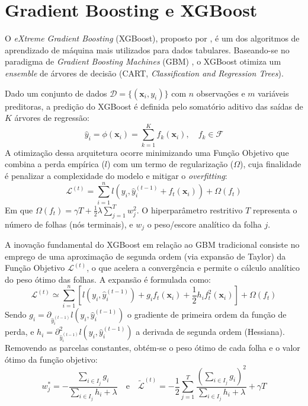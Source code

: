 \section{Gradient Boosting e XGBoost}
O \textit{eXtreme Gradient Boosting} (XGBoost), proposto por \cite{chen2016xgboost}, é um dos algoritmos de aprendizado de máquina mais utilizados para dados tabulares. Baseando-se no paradigma de \textit{Gradient Boosting Machines} (GBM) \cite{friedman2001greedy}, o XGBoost otimiza um \textit{ensemble} de árvores de decisão (CART, \textit{Classification and Regression Trees}).

Dado um conjunto de dados $\mathcal{D} = \{(\textbf{x}_i, y_i)\}$ com $n$ observações e $m$ variáveis preditoras, a predição do XGBoost é definida pelo somatório aditivo das saídas de $K$ árvores de regressão:
\begin{equation}
    \hat{y}_i = \phi(\textbf{x}_i) = \sum_{k=1}^K f_k(\textbf{x}_i), \quad f_k \in \mathcal{F}
    \label{eq:xgboost_pred}
\end{equation}
A otimização dessa arquitetura ocorre minimizando uma Função Objetivo que combina a perda empírica ($l$) com um termo de regularização ($\Omega$), cuja finalidade é penalizar a complexidade do modelo e mitigar o \textit{overfitting}:
\begin{equation}
    \mathcal{L}^{(t)} = \sum_{i=1}^n l(y_i, \hat{y}_i^{(t-1)} + f_t(\textbf{x}_i)) + \Omega(f_t)
    \label{eq:xgboost_loss}
\end{equation}
Em que $\Omega(f_t) = \gamma T + \frac{1}{2} \lambda \sum_{j=1}^T w_j^2$. O hiperparâmetro restritivo $T$ representa o número de folhas (nós terminais), e $w_j$ o peso/escore analítico da folha $j$. 

A inovação fundamental do XGBoost em relação ao GBM tradicional consiste no emprego de uma aproximação de segunda ordem (via expansão de Taylor) da Função Objetivo $\mathcal{L}^{(t)}$, o que acelera a convergência e permite o cálculo analítico do peso ótimo das folhas. A expansão é formulada como:
\begin{equation}
    \mathcal{L}^{(t)} \simeq \sum_{i=1}^n \left[ l(y_i, \hat{y}_i^{(t-1)}) + g_i f_t(\textbf{x}_i) + \frac{1}{2} h_i f_t^2(\textbf{x}_i) \right] + \Omega(f_t)
\end{equation}
Sendo $g_i = \partial_{\hat{y}_i^{(t-1)}} l(y_i, \hat{y}_i^{(t-1)})$ o gradiente de primeira ordem da função de perda, e $h_i = \partial_{\hat{y}_i^{(t-1)}}^2 l(y_i, \hat{y}_i^{(t-1)})$ a derivada de segunda ordem (Hessiana). Removendo as parcelas constantes, obtém-se o peso ótimo de cada folha e o valor ótimo da função objetivo:
\begin{equation}
    w_j^\ast = - \frac{\sum_{i \in I_j} g_i}{\sum_{i \in I_j} h_i + \lambda} \quad \text{e} \quad \tilde{\mathcal{L}}^{(t)} = -\frac{1}{2} \sum_{j=1}^T \frac{(\sum_{i \in I_j} g_i)^2}{\sum_{i \in I_j} h_i + \lambda} + \gamma T
    \label{eq:xgboost_leaf}
\end{equation}

